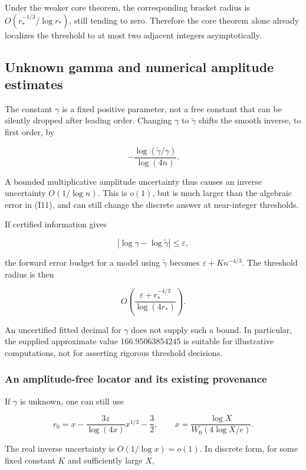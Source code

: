 \documentclass[11pt,letterpaper]{article}
\numberwithin{equation}{section}
\theoremstyle{remark}
\begin{document}
Under the weaker core theorem, the corresponding bracket radius is \(O(r_*^{-1/3}/\log r_*)\), still tending to zero. Therefore the core theorem alone already localizes the threshold to at most two adjacent integers asymptotically.

\subsection{Unknown gamma and numerical amplitude estimates}\label{air:rb:unknown-gamma-and-numerical-amplitude-estimates}

The constant \(\gamma\) is a fixed positive parameter, not a free constant that can be silently dropped after leading order. Changing \(\gamma\) to \(\widetilde{\gamma}\) shifts the smooth inverse, to first order, by

\[
-\frac{\log(\widetilde\gamma/\gamma)}{\log(4n)}.
\tag{I19}
\]

A bounded multiplicative amplitude uncertainty thus causes an inverse uncertainty \(O(1/\log n)\). This is \(o(1)\), but is much larger than the algebraic error in (I11), and can still change the discrete answer at near-integer thresholds.

If certified information gives

\[
|\log\gamma-\log\widetilde\gamma|\le\varepsilon,
\]

the forward error budget for a model using \(\widetilde{\gamma}\) becomes \(\varepsilon+K n^{-4/3}\). The threshold radius is then

\[
O\!\left(\frac{\varepsilon+r_*^{-4/3}}{\log(4r_*)}\right).
\]

An uncertified fitted decimal for \(\gamma\) does not supply such a bound. In particular, the supplied approximate value \(166.95063854245\) is suitable for illustrative computations, not for asserting rigorous threshold decisions.

\subsubsection{An amplitude-free locator and its existing provenance}\label{air:rb:an-amplitude-free-locator-and-its-existing-provenance}

If \(\gamma\) is unknown, one can still use

\[
r_0=x-\frac{3z}{\log(4x)}x^{1/3}-\frac32,
\qquad x=\frac{\log X}{W_0(4\log X/e)}.
\]

The real inverse uncertainty is \(O(1/\log x)=o(1)\). In discrete form, for some fixed constant \(K\) and sufficiently large \(X\),
\end{document}
